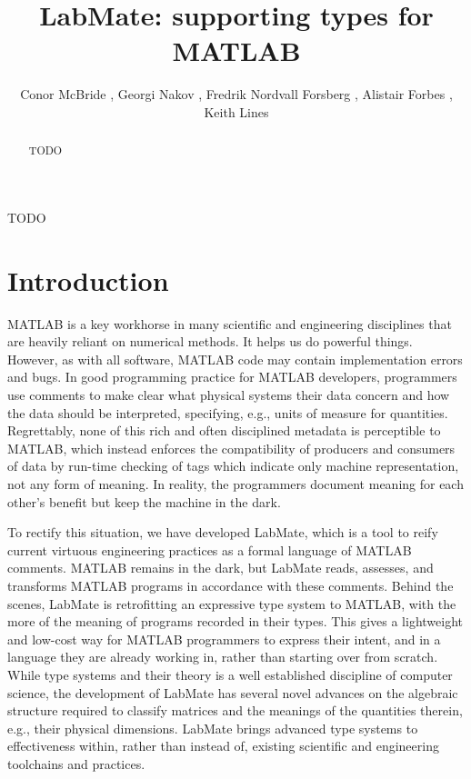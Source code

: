\documentclass{IMEKO2024}
\begin{document}
\title{LabMate: supporting types for MATLAB}
\author{Conor McBride  , Georgi Nakov  , Fredrik Nordvall Forsberg  , Alistair Forbes  , Keith Lines  }

\maketitle

\begin{abstract}
  TODO
\end{abstract}
\begin{keywords}
  TODO
\end{keywords}

\section{Introduction}

MATLAB is a key workhorse in many scientific and engineering
disciplines that are heavily reliant on numerical methods. It helps us
do powerful things. However, as with all software, MATLAB code may
contain implementation errors and bugs. In good programming practice
for MATLAB developers, programmers use comments to make clear what
physical systems their data concern and how the data should be
interpreted, specifying, e.g., units of measure for
quantities. Regrettably, none of this rich and often disciplined
metadata is perceptible to MATLAB, which instead enforces the
compatibility of producers and consumers of data by run-time checking
of tags which indicate only machine representation, not any form of
meaning. In reality, the programmers document meaning for each other's
benefit but keep the machine in the dark.

To rectify this situation, we have developed LabMate, which is a tool
to reify current virtuous engineering practices as a formal language
of MATLAB comments. MATLAB remains in the dark, but LabMate reads,
assesses, and transforms MATLAB programs in accordance with these
comments.
%
Behind the scenes, LabMate is retrofitting an expressive type system
to MATLAB, with the more of the meaning of programs recorded in their
types.
%
This gives a lightweight and low-cost way for MATLAB programmers to
express their intent, and in a language they are already working in,
rather than starting over from scratch.
%
While type systems and their theory is a well established discipline
of computer science, the development of LabMate has several novel
advances on the algebraic structure required to classify
matrices and the meanings of the quantities therein, e.g., their
physical dimensions. LabMate brings advanced type systems to
effectiveness within, rather than instead of, existing scientific and
engineering toolchains and practices.
\end{document}

